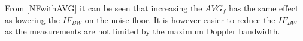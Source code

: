 \begin{where}
\end{where}

From \autoref{NFwithAVG} it can be seen that increasing the $AVG_f$ has the same effect as lowering the $IF_{BW}$ on the noise floor. It is however easier to reduce the $IF_{BW}$ as the measurements are not limited by the maximum Doppler bandwidth. 


%
%



